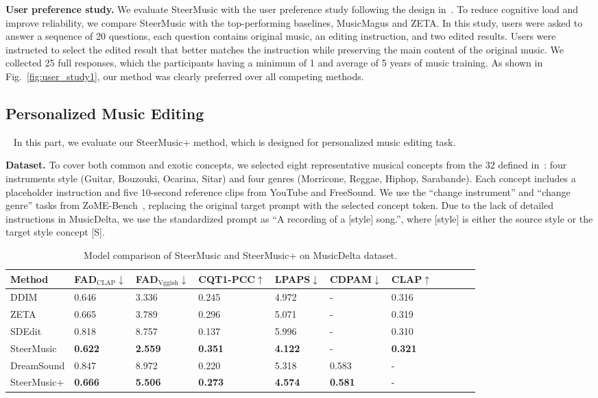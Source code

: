 \textbf{User preference study.} We evaluate SteerMusic with the user preference study following the design in~\citet{manor2024zero}. To reduce cognitive load and improve reliability, we compare SteerMusic with the top-performing baselines, MusicMagus and ZETA.
In this study, users were asked to answer a sequence of 20 questions, each question contains original music, an editing instruction, and two edited results. Users were instructed to select the edited result that better matches the instruction while preserving the main content of the original music. We collected 25 full responses, which the participants having a minimum of 1 and average of 5 years of music training. As shown in Fig.~\ref{fig:user_study1}, our method was clearly preferred over all competing methods.

\subsection{Personalized Music Editing } ~\label{sec:SteerMusic+_exp}
In this part, we evaluate our SteerMusic+ method, which is designed for personalized music editing task.

\textbf{Dataset.}
To cover both common and exotic concepts, we selected eight representative musical concepts from the 32 defined in~\citet{plitsis2024investigating}: four instruments style (Guitar, Bouzouki, Ocarina, Sitar) and four genres (Morricone, Reggae, Hiphop, Sarabande). Each concept includes a placeholder instruction and five 10-second reference clips from YouTube and FreeSound. We use the ``change instrument'' and ``change genre'' tasks from ZoME-Bench~\cite{liu2024medic}, replacing the original target prompt with the selected concept token. Due to the lack of detailed instructions in MusicDelta, we use the standardized prompt as ``A recording of a [style] song.'', where [style] is either the source style or the target style concept [S].

\begin{table}[t]
  \centering
{\fontsize{8pt}{9pt}\selectfont
  \begin{tabular}{l|llllllllll}
    \toprule
    Method & FAD$_{\text{CLAP}}$$\downarrow$  & FAD$_{\text{Vggish}}$$\downarrow$ & CQT1-PCC$\uparrow$ & LPAPS$\downarrow$ & CDPAM$\downarrow$ & CLAP$\uparrow$\\
    \midrule
    DDIM & 0.646 & 3.336 & 0.245 & 4.972 & - & 0.316 \\
    ZETA & 0.665 & 3.789 & 0.296 & 5.071 & - & 0.319 \\
    SDEdit & 0.818 & 8.757 & 0.137 & 5.996& - & 0.310 \\
    SteerMusic& \textbf{0.622}& \textbf{2.559} & \textbf{0.351} & \textbf{4.122} & - & \textbf{0.321} \\
    \midrule
    DreamSound & 0.847 & 8.972 & 0.220 & 5.318 & 0.583 & -\\
    SteerMusic+  & \textbf{0.666} & \textbf{5.506} & \textbf{0.273} & \textbf{4.574} & \textbf{0.581} & -\\
    \bottomrule
  \end{tabular}
  }
  \caption{Model comparison of SteerMusic and SteerMusic+ on MusicDelta dataset.}\label{tab:musicdelta}
\end{table}

